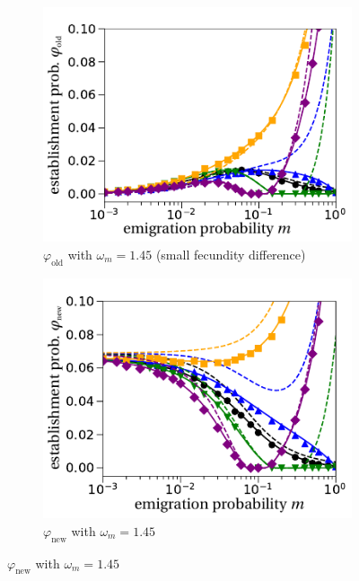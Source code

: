 \documentclass[a4paper,11pt]{scrartcl}
\begin{document}
\begin{figure}[h!]
\begin{subfigure}{.5\textwidth}
  		\centering
  		\includegraphics[width=\linewidth]{figS6c.pdf}
  		\caption{$\varphi_{\text{old}}$ with $\omega_m=1.45$ (small fecundity difference)}
	\end{subfigure}%
	\begin{subfigure}{.5\textwidth}
 		 \centering
 		 \includegraphics[width=\linewidth]{figS6d.pdf}
  	\caption{$\varphi_{\text{new}}$ with $\omega_m=1.45$}
	\end{subfigure}

\end{figure}
\end{document}
